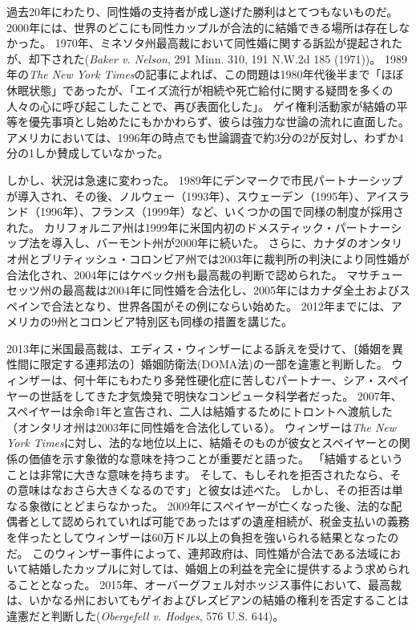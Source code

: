\documentclass[paper=a4,book,openany]{jlreq}
\begin{document}
過去20年にわたり、同性婚の支持者が成し遂げた勝利はとてつもないものだ。
2000年には、世界のどこにも同性カップルが合法的に結婚できる場所は存在しなかった。
1970年、ミネソタ州最高裁において同性婚に関する訴訟が提起されたが、却下された(\emph{Baker v. Nelson}, 291 Minn. 310, 191 N.W.2d 185 (1971))。
1989年の\emph{The New York Times}の記事によれば、この問題は1980年代後半まで「ほぼ休眠状態」であったが、「エイズ流行が相続や死亡給付に関する疑問を多くの人々の心に呼び起こしたことで、再び表面化した」\citep{gutis89:_small_steps_accep_renew_debat_gay_marriag}。
ゲイ権利活動家が結婚の平等を優先事項とし始めたにもかかわらず、彼らは強力な世論の流れに直面した。
アメリカにおいては、1996年の時点でも世論調査で約3分の2が反対し、わずか4分の1しか賛成していなかった\citep{center12:_growin_public_suppor_same_sex_marriag}。

しかし、状況は急速に変わった。
1989年にデンマークで市民パートナーシップが導入され、その後、ノルウェー（1993年）、スウェーデン（1995年）、アイスランド（1996年）、フランス（1999年）など、いくつかの国で同様の制度が採用された。
カリフォルニア州は1999年に米国内初のドメスティック・パートナーシップ法を導入し、バーモント州が2000年に続いた。
さらに、カナダのオンタリオ州とブリティッシュ・コロンビア州では2003年に裁判所の判決により同性婚が合法化され、2004年にはケベック州も最高裁の判断で認められた。
マサチューセッツ州の最高裁は2004年に同性婚を合法化し、2005年にはカナダ全土およびスペインで合法となり、世界各国がその例にならい始めた。
2012年までには、アメリカの9州とコロンビア特別区も同様の措置を講じた。

2013年に米国最高裁は、エディス・ウィンザーによる訴えを受けて、〔婚姻を異性間に限定する連邦法の〕婚姻防衛法(DOMA法)の一部を違憲と判断した。
ウィンザーは、何十年にもわたり多発性硬化症に苦しむパートナー、シア・スペイヤーの世話をしてきた才気煥発で明快なコンピュータ科学者だった。
2007年、スペイヤーは余命1年と宣告され、二人は結婚するためにトロントへ渡航した（オンタリオ州は2003年に同性婚を合法化している）。
ウィンザーは\emph{The New York Times}に対し、法的な地位以上に、結婚そのものが彼女とスペイヤーとの関係の価値を示す象徴的な意味を持つことが重要だと語った。
「結婚するということは非常に大きな意味を持ちます。
そして、もしそれを拒否されたなら、その意味はなおさら大きくなるのです」と彼女は述べた。
しかし、その拒否は単なる象徴にとどまらなかった。
2009年にスペイヤーが亡くなった後、法的な配偶者として認められていれば可能であったはずの遺産相続が、税金支払いの義務を伴ったとしてウィンザーは60万ドル以上の負担を強いられる結果となったのだ\citep{applebome12:_revel_her_suprem_court_momen}。
このウィンザー事件によって、連邦政府は、同性婚が合法である法域において結婚したカップルに対しては、婚姻上の利益を完全に提供するよう求められることとなった。
2015年、オーバーグフェル対ホッジス事件において、最高裁は、いかなる州においてもゲイおよびレズビアンの結婚の権利を否定することは違憲だと判断した(\emph{Obergefell v. Hodges}, 576 U.S. 644)。
\end{document}
